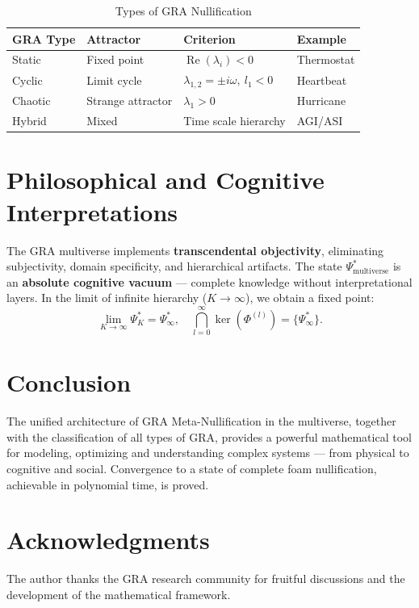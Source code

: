 \documentclass[12pt,a4paper]{article}
\begin{document}
\begin{table}[h]
\centering
\caption{Types of GRA Nullification}
\label{tab:types}
\begin{tabular}{|l|l|l|l|}
\hline
GRA Type & Attractor & Criterion & Example \\
\hline
Static & Fixed point & \(\operatorname{Re}(\lambda_i)<0\) & Thermostat \\
\hline
Cyclic & Limit cycle & \(\lambda_{1,2}=\pm i\omega,\ l_1<0\) & Heartbeat \\
\hline
Chaotic & Strange attractor & \(\lambda_1>0\) & Hurricane \\
\hline
Hybrid & Mixed & Time scale hierarchy & AGI/ASI \\
\hline
\end{tabular}
\end{table}

\section{Philosophical and Cognitive Interpretations}

The GRA multiverse implements \textbf{transcendental objectivity}, eliminating subjectivity, domain specificity, and hierarchical artifacts. The state \(\Psi_{\text{multiverse}}^*\) is an \textbf{absolute cognitive vacuum} — complete knowledge without interpretational layers. In the limit of infinite hierarchy (\(K\to\infty\)), we obtain a fixed point:
\[
\boxed{\lim_{K\to\infty} \Psi_K^* = \Psi_\infty^*,\quad \bigcap_{l=0}^{\infty} \ker(\Phi^{(l)}) = \{\Psi_\infty^*\}}.
\]

\section{Conclusion}

The unified architecture of GRA Meta-Nullification in the multiverse, together with the classification of all types of GRA, provides a powerful mathematical tool for modeling, optimizing and understanding complex systems — from physical to cognitive and social. Convergence to a state of complete foam nullification, achievable in polynomial time, is proved.

\section*{Acknowledgments}

The author thanks the GRA research community for fruitful discussions and the development of the mathematical framework.
\end{document}

